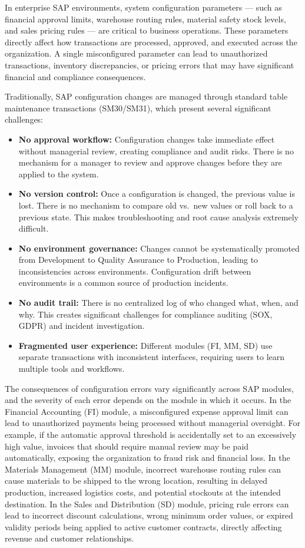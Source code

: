 \documentclass[12pt,a4paper]{report}
\begin{document}
In enterprise SAP environments, system configuration parameters --- such as financial approval limits, warehouse routing rules, material safety stock levels, and sales pricing rules --- are critical to business operations. These parameters directly affect how transactions are processed, approved, and executed across the organization. A single misconfigured parameter can lead to unauthorized transactions, inventory discrepancies, or pricing errors that may have significant financial and compliance consequences.

Traditionally, SAP configuration changes are managed through standard table maintenance transactions (SM30/SM31), which present several significant challenges:

\begin{itemize}[leftmargin=2em]
  \item \textbf{No approval workflow:} Configuration changes take immediate effect without managerial review, creating compliance and audit risks. There is no mechanism for a manager to review and approve changes before they are applied to the system.
  \item \textbf{No version control:} Once a configuration is changed, the previous value is lost. There is no mechanism to compare old vs.\ new values or roll back to a previous state. This makes troubleshooting and root cause analysis extremely difficult.
  \item \textbf{No environment governance:} Changes cannot be systematically promoted from Development to Quality Assurance to Production, leading to inconsistencies across environments. Configuration drift between environments is a common source of production incidents.
  \item \textbf{No audit trail:} There is no centralized log of who changed what, when, and why. This creates significant challenges for compliance auditing (SOX, GDPR) and incident investigation.
  \item \textbf{Fragmented user experience:} Different modules (FI, MM, SD) use separate transactions with inconsistent interfaces, requiring users to learn multiple tools and workflows.
\end{itemize}

The consequences of configuration errors vary significantly across SAP modules, and the severity of each error depends on the module in which it occurs. In the Financial Accounting (FI) module, a misconfigured expense approval limit can lead to unauthorized payments being processed without managerial oversight. For example, if the automatic approval threshold is accidentally set to an excessively high value, invoices that should require manual review may be paid automatically, exposing the organization to fraud risk and financial loss. In the Materials Management (MM) module, incorrect warehouse routing rules can cause materials to be shipped to the wrong location, resulting in delayed production, increased logistics costs, and potential stockouts at the intended destination. In the Sales and Distribution (SD) module, pricing rule errors can lead to incorrect discount calculations, wrong minimum order values, or expired validity periods being applied to active customer contracts, directly affecting revenue and customer relationships.
\end{document}
